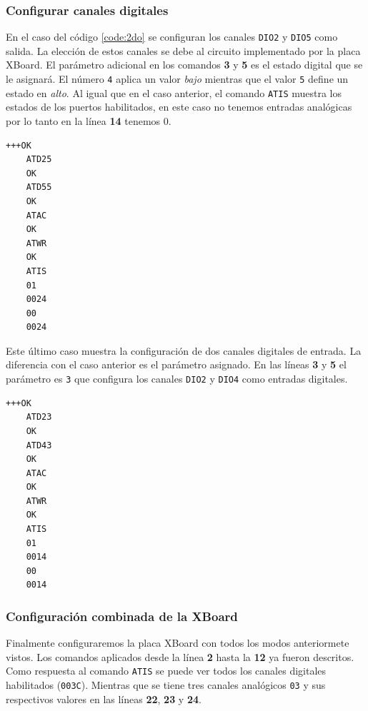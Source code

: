\documentclass[11pt,oneside,spanish,a4paper]{article}
\begin{document}
\subsubsection{Configurar canales digitales}
En el caso del código \ref{code:2do} se configuran los canales
\texttt{DIO2} y \texttt{DIO5} como salida. La elección de estos
canales se debe al circuito implementado por la placa XBoard. El
parámetro adicional en los comandos \textbf{3} y \textbf{5} es el
estado digital que se le asignará. El número \texttt{4} aplica un
valor \emph{bajo} mientras que el valor \texttt{5} define un estado
en \emph{alto}.  Al igual que en el caso anterior, el comando
\texttt{ATIS} muestra los estados de los puertos habilitados, en este
caso no tenemos entradas analógicas por lo tanto en la línea
\textbf{14} tenemos 0. 

\begin{lstlisting}[emph={+++,ATIS,ATD25,ATD55,ATWR,ATAC},
    emphstyle={\color{blue}}, caption={Configuración de dos salidas
      digitales en alto.}, label=code:2do]
    +++OK
    ATD25
    OK
    ATD55
    OK
    ATAC
    OK
    ATWR
    OK
    ATIS
    01
    0024
    00
    0024
\end{lstlisting}  

Este último caso muestra la configuración de dos canales digitales de
entrada. La diferencia con el caso anterior es el parámetro
asignado. En las líneas \textbf{3} y \textbf{5} el parámetro es
\texttt{3} que configura los canales \texttt{DIO2} y \texttt{DIO4}
como entradas digitales. 

\begin{lstlisting}[emph={+++,ATIS,ATD23,ATD43,ATWR,ATAC},
    emphstyle={\color{blue}}, caption={Configuración de dos entradas
      digitales.}, label=code:2di]
    +++OK
    ATD23
    OK
    ATD43
    OK
    ATAC
    OK  
    ATWR
    OK
    ATIS
    01
    0014
    00
    0014
\end{lstlisting}  

\subsubsection{Configuración combinada de la XBoard}

Finalmente configuraremos la placa XBoard con todos los modos
anteriormete vistos. Los comandos aplicados desde la línea \textbf{2}
hasta la \textbf{12} ya fueron descritos. Como respuesta al comando
\texttt{ATIS} se puede ver todos los canales digitales habilitados
(\texttt{003C}). Mientras que se tiene tres canales analógicos
\texttt{03} y sus respectivos valores en las líneas \textbf{22},
\textbf{23} y \textbf{24}.
\end{document}
